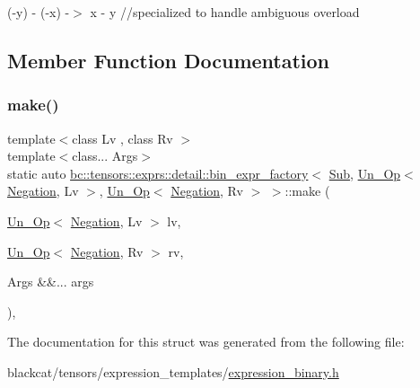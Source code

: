 (-\/y) -\/ (-\/x) -\/$>$ x -\/ y //specialized to handle ambiguous overload 

\subsection{Member Function Documentation}
\mbox{\label{structbc_1_1tensors_1_1exprs_1_1detail_1_1bin__expr__factory_3_01Sub_00_01Un__Op_3_01Negation_004b0c12d341e754dc0e6fb842519b678e_a8a07d7a099fa54d9326ec02b21f30d4e}} 
\subsubsection{\texorpdfstring{make()}{make()}}
{\footnotesize\ttfamily template$<$class Lv , class Rv $>$ \\
template$<$class... Args$>$ \\
static auto \hyperlink{structbc_1_1tensors_1_1exprs_1_1detail_1_1bin__expr__factory}{bc\+::tensors\+::exprs\+::detail\+::bin\+\_\+expr\+\_\+factory}$<$ \hyperlink{structbc_1_1oper_1_1Sub}{Sub}, \hyperlink{structbc_1_1tensors_1_1exprs_1_1Un__Op}{Un\+\_\+\+Op}$<$ \hyperlink{structbc_1_1oper_1_1Negation}{Negation}, Lv $>$, \hyperlink{structbc_1_1tensors_1_1exprs_1_1Un__Op}{Un\+\_\+\+Op}$<$ \hyperlink{structbc_1_1oper_1_1Negation}{Negation}, Rv $>$ $>$\+::make (\begin{DoxyParamCaption}\item[{\hyperlink{structbc_1_1tensors_1_1exprs_1_1Un__Op}{Un\+\_\+\+Op}$<$ \hyperlink{structbc_1_1oper_1_1Negation}{Negation}, Lv $>$}]{lv,  }\item[{\hyperlink{structbc_1_1tensors_1_1exprs_1_1Un__Op}{Un\+\_\+\+Op}$<$ \hyperlink{structbc_1_1oper_1_1Negation}{Negation}, Rv $>$}]{rv,  }\item[{Args \&\&...}]{args }\end{DoxyParamCaption})\hspace{0.3cm}{\ttfamily [inline]}, {\ttfamily [static]}}



The documentation for this struct was generated from the following file\+:\begin{DoxyCompactItemize}
\item 
blackcat/tensors/expression\+\_\+templates/\hyperlink{expression__binary_8h}{expression\+\_\+binary.\+h}\end{DoxyCompactItemize}
